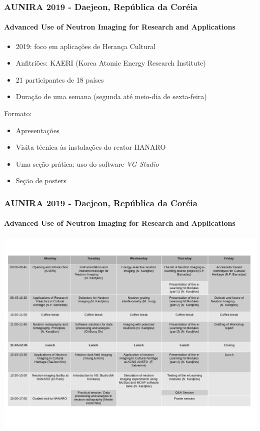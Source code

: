 \documentclass[svgnames,smaller,table]{beamer}
\begin{document}
\begin{frame}
  \frametitle{AUNIRA 2019 - Daejeon, República da Coréia}
  \framesubtitle{Advanced Use of Neutron Imaging for Research and Applications}
  \begin{itemize}
  \item 2019: foco em aplicações de  Herança Cultural
  \item Anfitriões: KAERI (Korea Atomic Energy Research Institute)
  \item 21 participantes de 18 países
  \item Duração de uma semana (segunda até meio-dia de sexta-feira)
  \end{itemize}
  Formato:
  \begin{itemize}
  \item Apresentações
  \item Visita técnica às instalações do reator HANARO
  \item Uma seção prática: uso do software \textit{VG Studio}\textcopyright
  \item Seção de posters
  \end{itemize}

\end{frame}

\begin{frame}
  \frametitle{AUNIRA 2019 - Daejeon, República da Coréia}
  \framesubtitle{Advanced Use of Neutron Imaging for Research and Applications}
  \begin{center}
    \includegraphics[scale=2.0]{figures/agenda.png}
    \end{center}
\end{frame}
\end{document}
